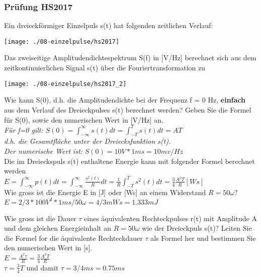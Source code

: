 \subsubsection{Prüfung HS2017}
Ein dreieckförmiger Einzelpuls s(t) hat folgenden zeitlichen Verlauf:
\begin{center}
    \vspace{-8pt}
    \texttt{[image: ./08-einzelpulse/hs2017]}
    \vspace{-8pt}
\end{center}

Das zweiseitige Amplitudendichtespektrum S(f) in [V/Hz] berechnet sich aus dem zeitkontinuierlichen Signal s(t) über die Fouriertransformation zu\\
\begin{center}
    \vspace{-8pt}
    \texttt{[image: ./08-einzelpulse/hs2017\_2]}
    \vspace{-8pt}
\end{center}

Wie kann S(0), d.h. die Amplitudendichte bei der Frequenz f = 0 Hz, \textbf{einfach} aus dem Verlauf des Dreieckpulses s(t) berechnet werden? Geben Sie die Formel für S(0), sowie
den numerischen Wert in [V/Hz] an.\\
\textit{Für f=0 gilt:} $S(0)=\int_{-\infty}^{\infty}s(t)dt=\int_{-T}^{T}s(t)dt=AT$\\

\textit{d.h. die Gesamtfläche unter der Dreiecksfunktion s(t).}\\
\textit{Der numerische Wert ist:} $S(0)=10V*1ms=10mv/Hz$\\

Die im Dreieckspuls s(t) enthaltene Energie kann mit folgender Formel berechnet werden\\
$E=\int_{-\infty}^{\infty}p(t)dt=\int_{-\infty}^{\infty}\frac{s^2(t)}{R}dt=\frac{1}{R}\int_{-T}^{T}s^2(t)dt=\frac{3}{4}\frac{A^2T}{R}[Ws]$\\

Wie gross ist die Energie E in [J] oder [Ws] an einem Widerstand $R = 50 \omega$?
$E = 2/3 * 100 V^2 * 1ms / 50 \omega = 4/3 mWs = 1.333 mJ$

Wie gross ist die Dauer $\tau$ eines äquivalenten Rechteckpulses r(t) mit Amplitude A und dem gleichen Energieinhalt an $R = 50 \omega$ wie der Dreieckpuls s(t)? Leiten Sie die Formel for die äquivalente Rechteckdauer $\tau$ als Formel her und bestimmen Sie den numerischen
Wert in [s].\\
$E=\frac{A^2 \tau }{R}=\frac{3}{4}\frac{A^2T}{R}$\\
$\tau=\frac{3}{4}T$ und damit $\tau=3/4 ms = 0.75ms$\\

